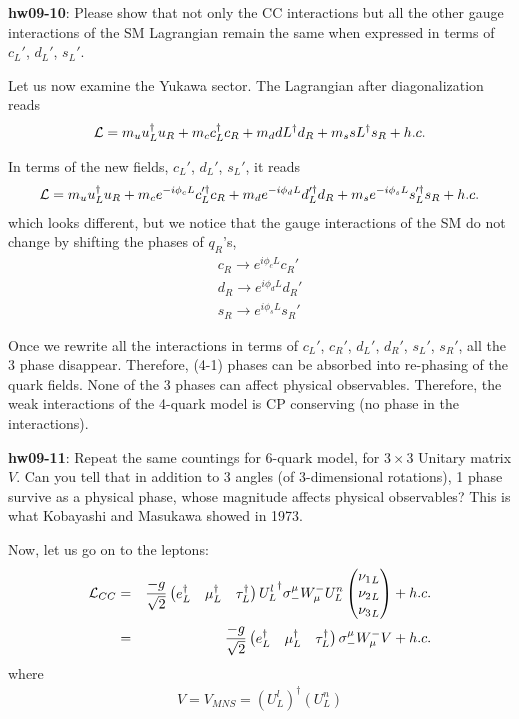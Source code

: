 \documentclass[12pt]{article}
\begin{document}
{\bf hw09-10}: Please show that not only the CC interactions but all the 
other gauge interactions of the SM Lagrangian remain the same when 
expressed in terms of $c_L'$, $d_L'$, $s_L'$.

  Let us now examine the Yukawa sector.  The Lagrangian after
  diagonalization reads
\begin{eqnarray}
  {\cal L}
  =
  m_u u_L^\dagger u_R + m_c c_L^\dagger c_R + m_d dL^\dagger d_R + m_s sL^\dagger s_R + h.c.
\end{eqnarray} 

  In terms of the new fields, $c_L'$, $d_L'$, $s_L'$, it reads
\begin{eqnarray}
  {\cal L} = m_u u_L^\dagger u_R
  + m_c e^{-i\phi_cL} c_L'^\dagger c_R
  + m_d e^{-i\phi_dL} d_L'^\dagger d_R
  + m_s e^{-i\phi_sL} s_L'^\dagger s_R
  + h.c.
\end{eqnarray}
  which looks different, but we notice that the gauge interactions
  of the SM do not change by shifting the phases of $q_R$'s,
\begin{eqnarray}
  c_R \to e^{i\phi_cL} c_R' \\
  d_R \to  e^{i\phi_dL} d_R' \\
  s_R \to  e^{i\phi_sL} s_R'
\end{eqnarray}

  Once we rewrite all the interactions in terms of $c_L'$, $c_R'$, $d_L'$, $d_R'$, $s_L'$, $s_R'$, all the 3 phase disappear.  Therefore, (4-1) phases can be absorbed into re-phasing of the quark fields. None of the 3 phases
  can affect physical observables. Therefore, the weak interactions 
of the 4-quark model is CP conserving (no phase in the interactions).

{\bf hw09-11}: Repeat the same countings for 6-quark model, for $3 \times 3$ Unitary matrix $V$. Can you tell that in addition to 3 angles (of 
3-dimensional rotations), 1 phase survive as a physical phase, whose magnitude
  affects physical observables?  This is what Kobayashi and Masukawa
  showed in 1973.

  Now, let us go on to the leptons:
\begin{eqnarray}
  {\cal L}_{CC} &=&  \frac{-g}{\sqrt2}
  \begin{pmatrix}
    e_L^\dagger &\mu_L^\dagger & \tau_L^\dagger
  \end{pmatrix}
  {U^l_L}^\dagger \sigma_-^\mu W^-_\mu U^n_L
  \begin{pmatrix}
    {\nu_1}_L \\ {\nu_2}_L \\ {\nu_3}_L
  \end{pmatrix}
    + h.c. \\ 
  &=& \frac{-g}{\sqrt2} 
  \begin{pmatrix}
    e_L^\dagger & \mu_L^\dagger & \tau_L^\dagger
  \end{pmatrix}
  \sigma_-^\mu W^-_\mu V + h.c.
\end{eqnarray}
  where
\begin{eqnarray}
  V = V_{MNS} = (U^l_L)^\dagger (U^n_L) \label{eq.9MNS}
\end{eqnarray}
\end{document}
